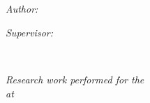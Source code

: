 \documentclass[
11pt, %
english, %
singlespacing, %
headsepline, %
]{MastersDoctoralThesis} %
\begin{document}
\begin{titlepage}
\begin{center}
\HRule \\[0.4cm] %
{\huge \bfseries \ttitle\par}\vspace{0.4cm} %
\HRule \\[1.5cm] %
 
\begin{minipage}[t]{0.4\textwidth}
\begin{flushleft} \large
\emph{Author:}\\
{\authorname} %
\end{flushleft}
\end{minipage}
\begin{minipage}[t]{0.4\textwidth}
\begin{flushright} \large
\emph{Supervisor:} \\
{\supname} %
\end{flushright}
\end{minipage}\\[3cm]
 
\vfill

\large \textit{Research work performed for the \degreename}\\[0.3cm] %
\textit{at}\\[0.4cm]

\begin{figure}[h]
    \centering
    \begin{subfigure}[t]{0.4\textwidth}
        \centering
    \end{subfigure}
    \begin{subfigure}[t]{0.4\textwidth}
        \centering
    \end{subfigure}
\end{figure}


\end{center}
\end{titlepage}
\end{document}

